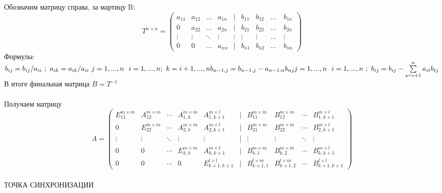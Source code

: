 \documentclass[a4paper,12pt]{article}
\begin{document}
Обозначим матрицу справа, за мартицу B:
$$T^{n\times n}=
   \begin{pmatrix}
     a_{11}& a_{12} &\ldots & a_{1n} & | & b_{11} & b_{12} & \ldots \ & b_{1n}\\
     0& a_{22} &\ldots & a_{2n} & | & b_{21} & b_{22} & \ldots \ & b_{2n}\\
     \vdots& \vdots &\ddots & \vdots &\vdots& \vdots &\vdots & \ldots & \vdots \\
     0& 0 &\ldots & a_{nn} & | & b_{n1} & b_{n2} & \ldots \ & b_{nn}
    \end{pmatrix}
$$
Формулы:\\
$b_{ij} = b_{ij}/a_{ii} \ ; \ a_{ik} = a_{ik}/a_{ii} \ j = 1,...,n \ \ i = 1,...,n; \ k = i+1,...,n\\
b_{n-1,j} = b_{n-1,j} - a_{n-1,n}b_{nj}\\
j = 1,...,n \ \ i = 1,...,n\ ; \ b_{ij} = b_{ij} - \sum\limits_{s = i+1}^n {a_{it}}{b_{tj}} $\\
В итоге финальная матрица $B = T^{-1}$\\\\
Получаем матрицу \begin{equation}
A=
  \begin{pmatrix} 
    E_{11}^{m \times m} & A_{12}^{m \times m} & \cdots & A_{1,k}^{m \times m} & A_{1,k+1}^{m \times l} & | & B_{11}^{m \times m} &  B_{12}^{m \times m} & \cdots & B_{1,k+1}^{m \times l}\\
    0 & E_{22}^{m \times m} & \cdots & A_{2,k}^{m \times m} & A_{2,k+1}^{m \times l} & | & B_{21}^{m \times m} &  B_{22}^{m \times m} & \cdots & B_{2,k+1}^{m \times l}\\
    \vdots & \vdots & \ddots & \vdots & \vdots & | & \vdots & \vdots & \ddots & \vdots\\ 
    0 & 0 & \cdots & E_{k,k}^{m \times m} & A_{k,k+1}^{m \times l} & | & B_{k,1}^{m \times m} &  B_{k,2}^{m \times m} & \cdots & B_{k,k+1}^{m \times l}\\
    0 & 0 & \cdots & 0 & E_{k+1,k+1}^{l \times l} & | & B_{k+1,1}^{l \times m} &  B_{k+1,2}^{l \times m} & \cdots & B_{k+1,k+1}^{l \times l} 
  \end{pmatrix}
\end{equation}
\\{\fontsize{10}{10}\selectfont ТОЧКА СИНХРОНИЗАЦИИ}\\
\end{document}
